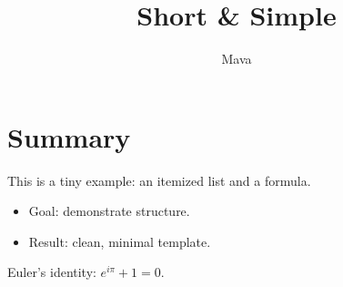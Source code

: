 \documentclass[11pt]{article}
\title{Short \& Simple}
\author{Mava}
\begin{document}
\maketitle

\section*{Summary}
This is a tiny example: an itemized list and a formula.

\begin{itemize}
  \item Goal: demonstrate structure.
  \item Result: clean, minimal template.
\end{itemize}

Euler's identity: \(e^{i\pi} + 1 = 0\).
\end{document}

